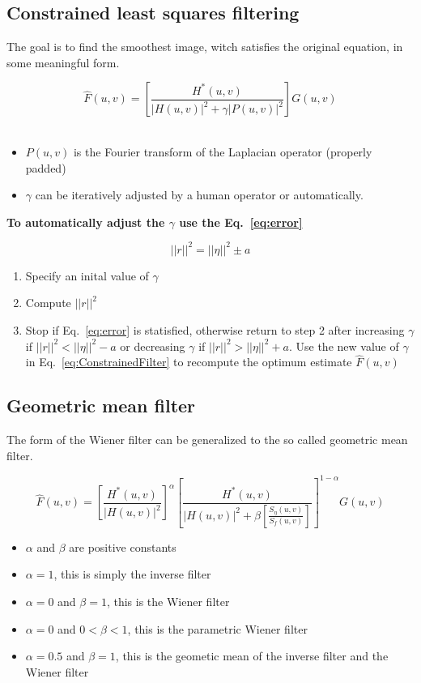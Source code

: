 \subsection{Constrained least squares filtering }
The goal is to find the smoothest image, witch satisfies the original equation, in some meaningful form.
 
\begin{equation}
	\hat{F}(u,v) = \left[ \frac{H^*(u,v)}{|H(u,v)|^2 + \gamma |P(u,v)|^2} \right] G(u,v)
	\label{eq:ConstrainedFilter}
\end{equation}\\

\begin{itemize}
	\item $P(u,v)$ is the Fourier transform of the Laplacian operator (properly padded)
	\item $\gamma$ can be iteratively adjusted by a human operator or automatically.
\end{itemize}

\textbf{To automatically adjust the $\gamma$ use the Eq.~\ref{eq:error}}

\begin{equation}
	||r||^2 = ||\eta||^2 \pm a
	\label{eq:error}
\end{equation}
\begin{enumerate}
	\item Specify an inital value of $\gamma$
	\item Compute $||r||^2$
	\item Stop if Eq.~\ref{eq:error} is statisfied, otherwise return to step 2 after increasing $\gamma$ if $||r||^2 < ||\eta||^2-a$ or  decreasing $\gamma$ if  $||r||^2 > ||\eta||^2+a$. Use the new value of $\gamma$ in Eq.~\ref{eq:ConstrainedFilter} to recompute the optimum estimate $\hat{F}(u,v)$
\end{enumerate}

\subsection{Geometric mean filter }
The form of the Wiener filter can be generalized to the so called geometric mean filter.

\begin{equation}
	\hat{F}(u,v) =  \left[ \frac{H^*(u,v)}{|H(u,v)|^2} \right]^{\alpha}  \left[ \frac{H^*(u,v)}{|H(u,v)|^2 + \beta \left[ \frac{S_\eta(u,v)}{S_f(u,v)}\right]} \right]^{1-\alpha} G(u,v)
\end{equation}

\begin{itemize}
	\item $\alpha$ and $\beta$ are positive constants
	\item $\alpha = 1$, this is simply the inverse filter
	\item $\alpha=0$ and $\beta=1$, this is the Wiener filter
	\item $\alpha=0$ and $0 < \beta < 1$, this is the parametric Wiener filter
	\item $\alpha=0.5$ and $\beta=1$, this is the geometic mean of the inverse filter and the Wiener filter
\end{itemize}

